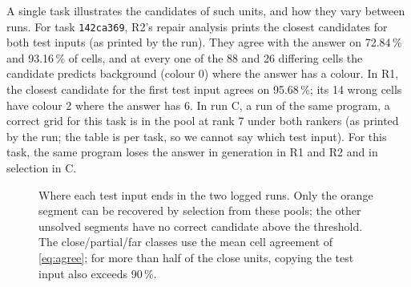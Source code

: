 \documentclass[11pt]{article}
\newcommand{\code}[1]{\texttt{#1}}
\newcommand{\R}[1]{R#1}
\begin{document}
A single task illustrates the candidates of such units, and how they vary between runs. For task \code{142ca369}, \R{2}'s repair analysis prints the closest candidates for both test inputs (as printed by the run). They agree with the answer on 72.84\,\% and 93.16\,\% of cells, and at every one of the 88 and 26 differing cells the candidate predicts background (colour 0) where the answer has a colour.
In \R{1}, the closest candidate for the first test input agrees on 95.68\,\%; its 14 wrong cells have colour 2 where the answer has 6.
In run C, a run of the same program, a correct grid for this task is in the pool at rank 7 under both rankers (as printed by the run; the table is per task, so we cannot say which test input). For this task, the same program loses the answer in generation in \R{1} and \R{2} and in selection in C.

\begin{figure}[t]
\centering
{}
\caption{Where each test input ends in the two logged runs. Only the orange segment can be recovered by selection from these pools; the other unsolved segments have no correct candidate above the threshold. The close/partial/far classes use the mean cell agreement of \cref{eq:agree}; for more than half of the close units, copying the test input also exceeds 90\,\%.}
\label{fig:loss}
\end{figure}
\end{document}
